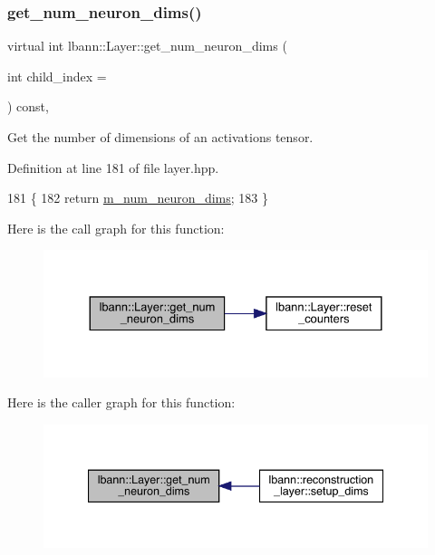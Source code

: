 \subsubsection{\texorpdfstring{get\+\_\+num\+\_\+neuron\+\_\+dims()}{get\_num\_neuron\_dims()}}
{\footnotesize\ttfamily virtual int lbann\+::\+Layer\+::get\+\_\+num\+\_\+neuron\+\_\+dims (\begin{DoxyParamCaption}\item[{int}]{child\+\_\+index = {} }\end{DoxyParamCaption}) const\hspace{0.3cm}{\ttfamily [inline]}, {\ttfamily [virtual]}}

Get the number of dimensions of an activations tensor. 

Definition at line 181 of file layer.\+hpp.


\begin{DoxyCode}
181                                                              \{
182     \textcolor{keywordflow}{return} \hyperlink{classlbann_1_1Layer_adfd6178d21498c9095cd947ae1eb2d6a}{m\_num\_neuron\_dims};
183   \}
\end{DoxyCode}
Here is the call graph for this function\+:\nopagebreak
\begin{figure}[H]
\begin{center}
\leavevmode
\includegraphics[width=330pt]{classlbann_1_1Layer_aa35561e662de84deae26045ccb53d862_cgraph}
\end{center}
\end{figure}
Here is the caller graph for this function\+:\nopagebreak
\begin{figure}[H]
\begin{center}
\leavevmode
\includegraphics[width=340pt]{classlbann_1_1Layer_aa35561e662de84deae26045ccb53d862_icgraph}
\end{center}
\end{figure}
\mbox{\label{classlbann_1_1Layer_aa4de686cc6c2dd38166f42faf874f227}} 
